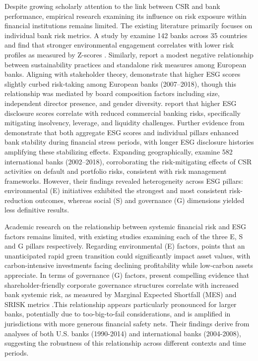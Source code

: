 \documentclass[
  authoryear]{elsarticle}
\begin{document}
Despite growing scholarly attention to the link between CSR and bank
performance, empirical research examining its influence on risk exposure
within financial institutions remains limited. The existing literature
primarily focuses on individual bank risk metrics. A study by
\citet{GANGI2019} examine 142 banks across 35 countries and find that
stronger environmental engagement correlates with lower risk profiles as
measured by Z-scores \citep[see][]{LAEVEN2009}. Similarly,
\citet{SCHOLTENS2019} report a modest negative relationship between
sustainability practices and standalone risk measures among European
banks. Aligning with stakeholder theory, \citet{DI_TOMMASO2020}
demonstrate that higher ESG scores slightly curbed risk-taking among
European banks (2007--2018), though this relationship was mediated by
board composition factors including size, independent director presence,
and gender diversity. \citet{GANGWANI2024} report that higher ESG
disclosure scores correlate with reduced commercial banking risks,
specifically mitigating insolvency, leverage, and liquidity challenges.
Further evidence from \citet{CHIARAMONTE2022} demonstrate that both
aggregate ESG scores and individual pillars enhanced bank stability
during financial stress periods, with longer ESG disclosure histories
amplifying these stabilizing effects. Expanding geographically,
\citet{NEITZERT2022} examine 582 international banks (2002--2018),
corroborating the risk-mitigating effects of CSR activities on default
and portfolio risks, consistent with risk management frameworks.
However, their findings revealed heterogeneity across ESG pillars:
environmental (E) initiatives exhibited the strongest and most
consistent risk-reduction outcomes, whereas social (S) and governance
(G) dimensions yielded less definitive results.

Academic research on the relationship between systemic financial risk
and ESG factors remains limited, with existing studies examining each of
the three E, S and G pillars respectively. Regarding environmental (E)
factors, \citet{ESRB2016} points that an unanticipated rapid green
transition could significantly impact asset values, with
carbon-intensive investments facing declining profitability while
low-carbon assets appreciate. In terms of governance (G) factors,
\citet{ANGINER2018} present compelling evidence that
shareholder-friendly corporate governance structures correlate with
increased bank systemic risk, as measured by Marginal Expected Shortfall
(MES)\citep{ACHARYA2017} and SRISK metrics \citep{BROWNLEES2017}.This
relationship appears particularly pronounced for larger banks,
potentially due to too-big-to-fail considerations, and is amplified in
jurisdictions with more generous financial safety nets. Their findings
derive from analyses of both U.S. banks (1990-2014) and international
banks (2004-2008), suggesting the robustness of this relationship across
different contexts and time periods.
\end{document}
